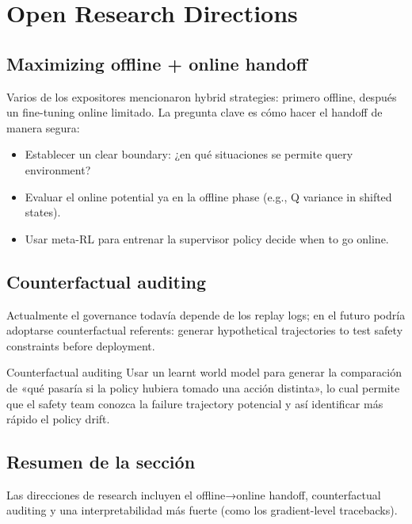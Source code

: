 \section{Open Research Directions}

\subsection{Maximizing offline + online handoff}

Varios de los expositores mencionaron hybrid strategies: primero offline, después un fine-tuning online limitado. La pregunta clave es cómo hacer el handoff de manera segura:

\begin{itemize}
    \item Establecer un clear boundary: ¿en qué situaciones se permite query environment?
    \item Evaluar el online potential ya en la offline phase (e.g., Q variance in shifted states).
    \item Usar meta-RL para entrenar la supervisor policy decide when to go online.
\end{itemize}

\subsection{Counterfactual auditing}

Actualmente el governance todavía depende de los replay logs; en el futuro podría adoptarse counterfactual referents: generar hypothetical trajectories to test safety constraints before deployment.

\begin{knowledgebox}{Counterfactual auditing}
Usar un learnt world model para generar la comparación de «qué pasaría si la policy hubiera tomado una acción distinta», lo cual permite que el safety team conozca la failure trajectory potencial y así identificar más rápido el policy drift.
\end{knowledgebox}

\subsection{Resumen de la sección}

Las direcciones de research incluyen el offline→online handoff, counterfactual auditing y una interpretabilidad más fuerte (como los gradient-level tracebacks).

